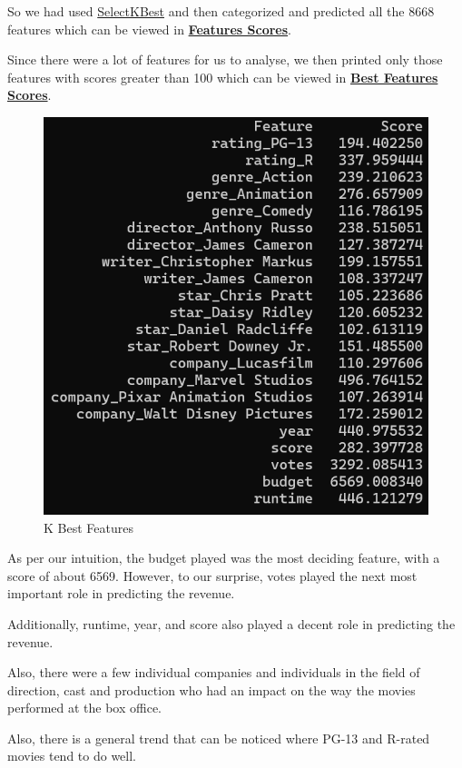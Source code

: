 \documentclass[conference]{IEEEtran}
\begin{document}
            So we had used \href{https://scikit-learn.org/stable/modules/generated/sklearn.feature_selection.SelectKBest.html}{SelectKBest} and then categorized and predicted all the 8668 features which can be viewed in \href{https://github.com/Vikranth3140/Movie-Revenue-Prediction/blob/main/Helper%20files/Best%20Festures/feature_scores.txt}{\textbf{Features Scores}}.
            
            Since there were a lot of features for us to analyse, we then printed only those features with scores greater than 100 which can be viewed in \href{https://github.com/Vikranth3140/Movie-Revenue-Prediction/blob/main/Helper%20files/Best%20Festures/significant_features.txt}{\textbf{Best Features Scores}}.
            
            \begin{figure}[H]
                \centering
                \includegraphics[width=0.5\linewidth]{k-best.png}
                \caption{K Best Features}
                \label{fig:k-best}
            \end{figure}
            
            As per our intuition, the budget played was the most deciding feature, with a score of about 6569.
            However, to our surprise, votes played the next most important role in predicting the revenue.
            
            Additionally, runtime, year, and score also played a decent role in predicting the revenue.
            
            Also, there were a few individual companies and individuals in the field of direction, cast and production who had an impact on the way the movies performed at the box office.
            
            Also, there is a general trend that can be noticed where PG-13 and R-rated movies tend to do well.
            
\end{document}
